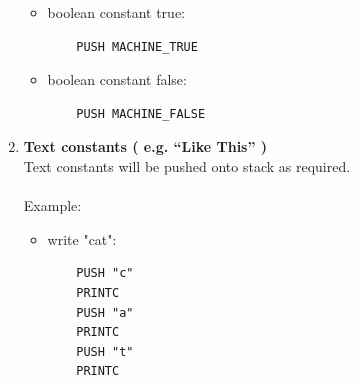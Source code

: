\documentclass[11pt]{article}
\begin{document}
\begin{enumerate}[label=(\alph*)]
\begin{itemize}
    \item boolean constant true: 
    \begin{lstlisting}
    PUSH MACHINE_TRUE
    \end{lstlisting}
    
    \item boolean constant false:
    \begin{lstlisting}
    PUSH MACHINE_FALSE
    \end{lstlisting}
    \end{itemize}
    
\item \textbf{Text constants ( e.g. ``Like This'' )}\\
    Text constants will be pushed onto stack as required.\\
\\
Example:
\begin{itemize}
\item write "cat":
	\begin{lstlisting}
    PUSH "c"
    PRINTC
    PUSH "a"
    PRINTC
    PUSH "t"
    PRINTC
    \end{lstlisting}
\end{itemize}
\end{enumerate}

\end{document}
